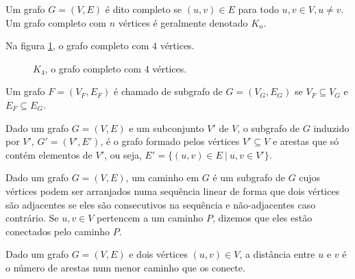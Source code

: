 \begin{definition}
  Um grafo $G = (V, E)$ é dito completo se $(u, v) \in E$ para todo $u, v \in V, u \neq v$. Um grafo completo com $n$ vértices é geralmente denotado $K_n$.

  Na figura \ref{fig:k4}, o grafo completo com $4$ vértices.

  \begin{figure}
    \centering

    \caption{$K_4$, o grafo completo com $4$ vértices.}
    \label{fig:k4}
  \end{figure}
\end{definition}

\begin{definition}[subgrafo]
  Um grafo $F = (V_F, E_F)$ é chamado de subgrafo de $G = (V_G, E_G)$ se $V_F \subseteq V_G$ e $E_F \subseteq E_G$.
\end{definition}

\begin{definition}
  Dado um grafo $G = (V, E)$ e um subconjunto $V'$ de $V$, o subgrafo de $G$ induzido por $V'$, $G' = (V', E')$, é o grafo formado pelos vértices $V' \subseteq V$ e arestas que só contém elementos de $V'$, ou seja, $E' = \{(u, v) \in E \ | \  u, v \in V'\}$.
\end{definition}

\begin{definition}[caminho]
  Dado um grafo $G = (V, E)$, um caminho em $G$ é um subgrafo de $G$ cujos vértices podem ser arranjados numa sequência linear de forma que dois vértices são adjacentes se eles são consecutivos na sequência e não-adjacentes caso contrário. Se $u, v \in V$ pertencem a um caminho $P$, dizemos que eles estão conectados pelo caminho $P$.
\end{definition}

\begin{definition}[distância]
  Dado um grafo $G = (V, E)$ e dois vértices $(u, v) \in V$, a distância entre $u$ e $v$ é o número de arestas num menor caminho que os conecte.
\end{definition}

